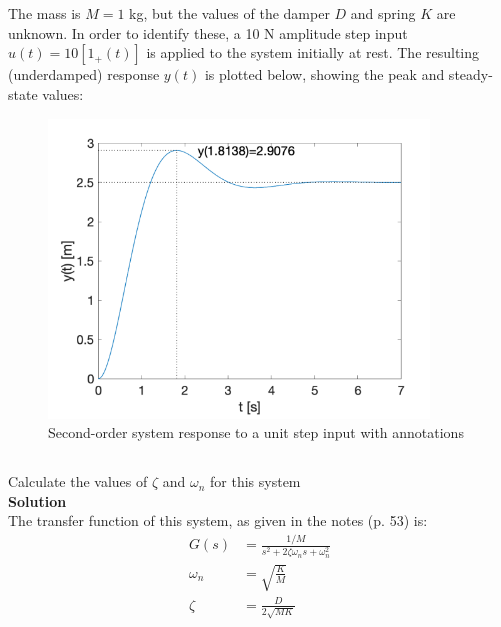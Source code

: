 \section{}
The mass is $M = 1$ kg, but the values of the damper $D$ and spring $K$ are unknown. In order to
identify these, a 10 N amplitude step input $u(t) = 10[1_{+}(t)]$ is applied to the system initially at rest.
The resulting (underdamped) response $y(t)$ is plotted below, showing the peak and steady-state
values:
\begin{figure}[h]
    \centering
    \includegraphics[width=0.9\textwidth]{Questions/Figures/Q2ProblemDiagram.png}
    \caption{Second-order system response to a unit step input with annotations}
    \label{fig:Q2ProblemDiagram}
\end{figure}

\subsection{}
Calculate the values of $\zeta$ and $\omega_n$ for this system \\

\textbf{Solution} \\

The transfer function of this system, as given in the notes (p. 53) is:
\begin{align}
    G(s) &= \frac{1/M}{s^2 + 2 \zeta \omega_n s + \omega_n^2} \nonumber \\
    \omega_n &= \sqrt{\frac{K}{M}} \label{eq:omega_n} \\
    \zeta &= \frac{D}{2 \sqrt{MK}} \label{eq:zeta}
\end{align}


